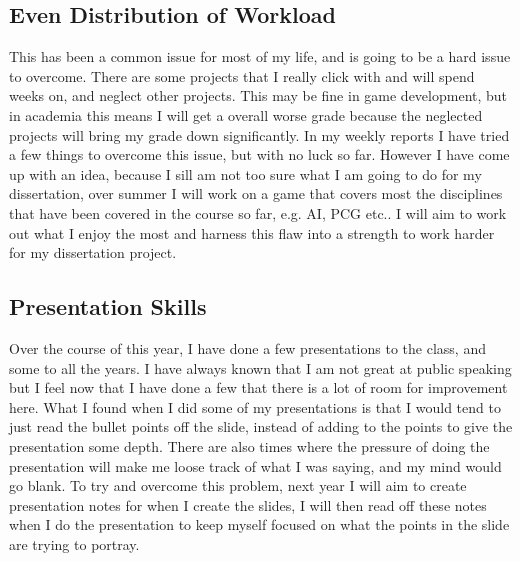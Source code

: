 \documentclass{scrartcl}
\begin{document}
\subsection{Even Distribution of Workload}
This has been a common issue for most of my life, and is going to be a hard issue to overcome. There are some projects that I really click with and will spend weeks on, and neglect other projects. This may be fine in game development, but in academia this means I will get a overall worse grade because the neglected projects will bring my grade down significantly.
In my weekly reports I have tried a few things to overcome this issue, but with no luck so far. However I have come up with an idea, because I sill am not too sure what I am going to do for my dissertation, over summer I will work on a game that covers most the disciplines that have been covered in the course so far, e.g. AI, PCG etc.. I will aim to work out what I enjoy the most and harness this flaw into a strength to work harder for my dissertation project.

\subsection{Presentation Skills}
Over the course of this year, I have done a few presentations to the class, and some to all the years. I have always known that I am not great at public speaking but I feel now that I have done a few that there is a lot of room for improvement here. What I found when I did some of my presentations is that I would tend to just read the bullet points off the slide, instead of adding to the points to give the presentation some depth. There are also times where the pressure of doing the presentation will make me loose track of what I was saying, and my mind would go blank.
To try and overcome this problem, next year I will aim to create presentation notes for when I create the slides, I will then read off these notes when I do the presentation to keep myself focused on what the points in the slide are trying to portray. 

\end{document}
